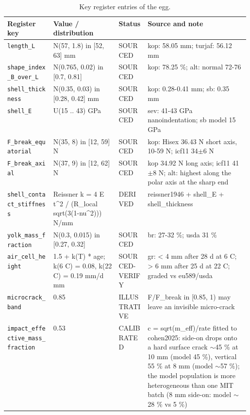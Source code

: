 \documentclass[10.5pt,a4paper]{article}
\begin{document}
\begin{table}[htbp]\centering\scriptsize\caption{Key register entries of the egg.}
\begin{tabularx}{\linewidth}{@{}p{0.19\linewidth}p{0.27\linewidth}p{0.12\linewidth}X@{}}\toprule Register key & Value / distribution & Status & Source and note \\\midrule
\texttt{length\_\allowbreak{}L} & N(57, 1.8) in [52, 63] mm & SOURCED & kop: 58.05 mm; turjaf: 56.12 mm \\
\texttt{shape\_\allowbreak{}index\_\allowbreak{}B\_\allowbreak{}over\_\allowbreak{}L} & N(0.765, 0.02) in [0.7, 0.81] & SOURCED & kop: 78.25 \%; alt: normal 72-76 \\
\texttt{shell\_\allowbreak{}thickness} & N(0.35, 0.03) in [0.28, 0.42] mm & SOURCED & kop: 0.28-0.41 mm; sb: 0.35 mm \\
\texttt{shell\_\allowbreak{}E} & U(15 .. 43) GPa & SOURCED & sev: 41-43 GPa nanoindentation; sb model 15 GPa \\
\texttt{F\_\allowbreak{}break\_\allowbreak{}equatorial} & N(35, 8) in [12, 59] N & SOURCED & kop: Hisex 36.43 N short axis, 10-59 N; icf11 34$\pm$6 N \\
\texttt{F\_\allowbreak{}break\_\allowbreak{}axial} & N(37, 9) in [12, 62] N & SOURCED & kop 34.92 N long axis; icf11 41$\pm$8 N; alt: highest along the polar axis at the sharp end \\
\texttt{shell\_\allowbreak{}contact\_\allowbreak{}stiffness} & Reissner k = 4 E t\^{}2 / (R\_local sqrt(3(1-nu\^{}2))) N/mm & DERIVED & reissner1946 + shell\_E + shell\_thickness \\
\texttt{yolk\_\allowbreak{}mass\_\allowbreak{}fraction} & N(0.3, 0.015) in [0.27, 0.32] & SOURCED & br: 27-32 \%; usda 31 \% \\
\texttt{air\_\allowbreak{}cell\_\allowbreak{}height} & 1.5 + k(T) * age; k(6 C) = 0.08, k(22 C) = 0.19 mm/d mm & SOURCED-VERIFY & gr: < 4 mm after 28 d at 6 C; > 6 mm after 25 d at 22 C; graded vs eu589/usda \\
\texttt{microcrack\_\allowbreak{}band} & 0.85 & ILLUSTRATIVE & F/F\_break in [0.85, 1) may leave an invisible micro-crack \\
\texttt{impact\_\allowbreak{}effective\_\allowbreak{}mass\_\allowbreak{}fraction} & 0.53 & CALIBRATED & c = sqrt(m\_eff)/rate fitted to cohen2025: side-on drops onto a hard surface crack $\sim$45 \% at 10 mm (model 45 \%), vertical 55 \% at 8 mm (model $\sim$57 \%); the model population is more heterogeneous than one MIT batch (8 mm side-on: model $\sim$28 \% vs 5 \%) \\

\end{tabularx}
\end{table}
\end{document}
